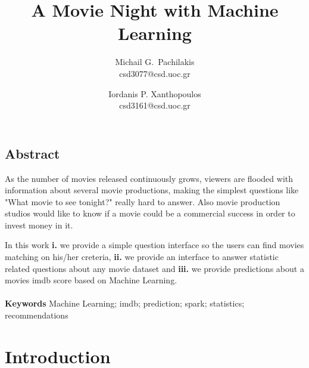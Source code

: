 \documentclass[letterpaper,twocolumn,10pt]{article}
\begin{document}
\date{}

\title{\Large \bf A Movie Night with Machine Learning}

\author{
{\rm Michail G.\ Pachilakis}\\
csd3077@csd.uoc.gr
\and
{\rm Iordanis P. Xanthopoulos}\\
csd3161@csd.uoc.gr
} %

\maketitle

\thispagestyle{empty}


\subsection*{Abstract}
\par As the number of movies released continuously grows, viewers are flooded with information about several movie productions, making the simplest questions like "What movie to see tonight?" really hard to answer. Also movie production studios would like to know if a movie could be a commercial success in order to invest money in it.\par In this work \textbf{i.} we provide a simple question interface so the users can find movies matching on his/her creteria, \textbf{ii.} we provide an interface to answer statistic related questions about any movie dataset and \textbf{iii.} we provide predictions about a movies imdb score based on Machine Learning.\\
\\
\textbf{Keywords} Machine Learning; imdb; prediction; spark; statistics; recommendations


\section{Introduction}
\end{document}

